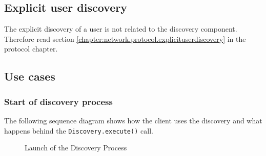 \subsection{Explicit user discovery}
The explicit discovery of a user is not related to the discovery component. Therefore read section \ref{chapter:network.protocol.explicituserdiscovery} in the protocol chapter.

\subsection{Use cases}
\subsubsection{Start of discovery process}
The following sequence diagram shows how the client uses the discovery and what happens behind the \texttt{Discovery.execute()} call.

\begin{figure}[H]
 \centering
 \caption{Launch of the Discovery Process}
 \label{fig:network.discovery.launch}
\end{figure}


